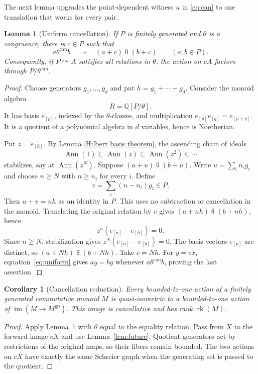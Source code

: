 \documentclass[10pt,a4paper]{amsart}
\newtheorem{lemma}[theorem]{Lemma}
\newtheorem{corollary}[theorem]{Corollary}
\DeclareMathOperator{\rk}{rk}
\DeclareMathOperator{\im}{im}
\newcommand{\QQ}{\mathbb Q}
\newcommand{\gp}{\mathrm{gp}}
\newcommand{\act}{\curvearrowright}
\begin{document}
The next lemma upgrades the point-dependent witness $u$ in
\eqref{eq:can} to one translation that works for every pair.

\begin{lemma}[Uniform cancellation]\label{lem:uniform}
If $P$ is finitely generated and $\theta$ is a congruence, there is $c\in P$
such that
\begin{equation}\label{eq:uniform}
 a\mathrel{\theta^{\mathrm{can}}}b
 \quad\Longrightarrow\quad
 (a+c)\mathrel\theta (b+c)
 \qquad(a,b\in P).
\end{equation}
Consequently, if $P\act A$ satisfies all relations in $\theta$, the action
on $cA$ factors through $P/\theta^{\mathrm{can}}$.
\end{lemma}

\begin{proof}
Choose generators $g_1,\ldots,g_d$ and put $h=g_1+\cdots+g_d$. Consider
the monoid algebra
\[
 R=\QQ[P/\theta].
\]
It has basis $e_{[p]}$, indexed by the $\theta$-classes, and multiplication
$e_{[p]}e_{[q]}=e_{[p+q]}$. It is a quotient of a polynomial algebra in $d$
variables, hence is Noetherian.

Put $z=e_{[h]}$. By Lemma \ref{Hilbert basis theorem}, the ascending chain of ideals
\[
 \operatorname{Ann}(1)\subseteq\operatorname{Ann}(z)
 \subseteq\operatorname{Ann}(z^2)\subseteq\cdots
\]
stabilizes, say at $\operatorname{Ann}(z^N)$. Suppose
$(a+u)\mathrel\theta(b+u)$. Write $u=\sum_i n_i g_i$ and choose
$n\ge N$ with $n\ge n_i$ for every $i$. Define
\[
 v=\sum_i(n-n_i)g_i\in P.
\]
Then $u+v=nh$ as an identity in $P$. This uses no subtraction or
cancellation in the monoid. Translating the original relation by $v$
gives $(a+nh)\mathrel\theta(b+nh)$, hence
\[
 z^n(e_{[a]}-e_{[b]})=0.
\]
Since $n\ge N$, stabilization gives $z^N(e_{[a]}-e_{[b]})=0$.
The basis vectors $e_{[p]}$ are distinct, so
$(a+Nh)\mathrel\theta(b+Nh)$. Take $c=Nh$.
For $y=cx$, equation~\eqref{eq:uniform} gives $ay=by$ whenever
$a\mathrel{\theta^{\mathrm{can}}}b$, proving the last assertion.
\end{proof}

\begin{corollary}[Cancellation reduction]\label{cor:cancellation}
Every bounded-to-one action of a finitely generated commutative monoid $M$
is quasi-isometric to a bounded-to-one action of
$\im(M\to M^{\gp})$. This image is cancellative and has rank $\rk(M)$.
\end{corollary}

\begin{proof}
Apply Lemma~\ref{lem:uniform} with $\theta$ equal to the equality relation. Pass from
$X$ to the forward image $cX$ and use Lemma~\ref{lem:future}. Quotient
generators act by restrictions of the original maps, so their fibers
remain bounded. The two actions on $cX$ have exactly the same Schreier
graph when the generating set is passed to the quotient.
\end{proof}
\end{document}
